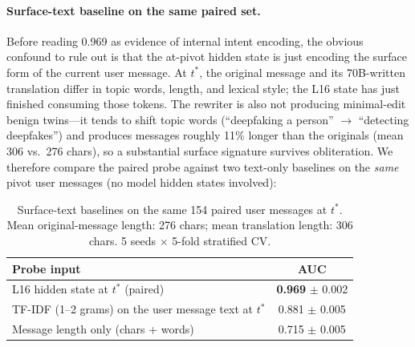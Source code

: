 \documentclass[11pt]{article}
\begin{document}
\paragraph{Surface-text baseline on the same paired set.}
Before reading 0.969 as evidence of internal intent encoding, the obvious confound to rule out is that the at-pivot hidden state is just encoding the surface form of the current user message.
At $t^*$, the original message and its 70B-written translation differ in topic words, length, and lexical style; the L16 state has just finished consuming those tokens.
The rewriter is also not producing minimal-edit benign twins---it tends to shift topic words (``deepfaking a person'' $\to$ ``detecting deepfakes'') and produces messages roughly 11\% longer than the originals (mean 306 vs.\ 276 chars), so a substantial surface signature survives obliteration.
We therefore compare the paired probe against two text-only baselines on the \emph{same} pivot user messages (no model hidden states involved):

\begin{table}[h]
\centering
\begin{tabular}{lc}
\toprule
\textbf{Probe input} & \textbf{AUC} \\
\midrule
L16 hidden state at $t^*$ (paired)                    & \textbf{0.969} $\pm$ 0.002 \\
TF-IDF (1--2 grams) on the user message text at $t^*$ & 0.881 $\pm$ 0.005 \\
Message length only (chars + words)                   & 0.715 $\pm$ 0.005 \\
\bottomrule
\end{tabular}
\caption{Surface-text baselines on the same 154 paired user messages at $t^*$. Mean original-message length: 276 chars; mean translation length: 306 chars. 5 seeds $\times$ 5-fold stratified CV.}
\label{tab:paired_baselines}
\end{table}
\end{document}
